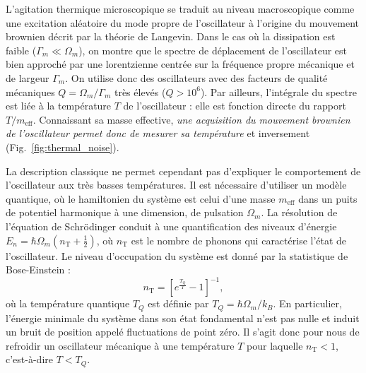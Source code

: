 \documentclass[12pt,a4paper]{article}
\begin{document}
L'agitation thermique microscopique se traduit au niveau macroscopique comme une excitation aléatoire du mode propre de l'oscillateur à l'origine du mouvement brownien décrit par la théorie de Langevin.
Dans le cas où la dissipation est faible ($\Gamma_m \ll \Omega_m$), on montre que le spectre de déplacement de l'oscillateur est bien approché par une lorentzienne centrée sur la fréquence propre mécanique et de largeur $\Gamma_m$.
On utilise donc des oscillateurs avec des facteurs de qualité mécaniques $Q=\Omega_m/\Gamma_m$ très élevés ($Q>10^6$).
Par ailleurs, l'intégrale du spectre est liée à la température $T$ de l'oscillateur : elle est fonction directe du rapport $T/m_\mathrm{eff}$.
Connaissant sa masse effective, \textit{une acquisition du mouvement brownien de l'oscillateur permet donc de mesurer sa température} et inversement (Fig.~\ref{fig:thermal_noise}).

La description classique ne permet cependant pas d'expliquer le comportement de l'oscillateur aux très basses températures.
Il est nécessaire d'utiliser un modèle quantique, où le hamiltonien du système est celui d'une masse $m_\mathrm{eff}$ dans un puits de potentiel harmonique à une dimension, de pulsation $\Omega_m$.
La résolution de l'équation de Schrödinger conduit à une quantification des niveaux d'énergie $E_n = \hbar\Omega_m (n_\mathrm{T}+\frac{1}{2})$, où $n_\mathrm{T}$ est le nombre de phonons qui caractérise l'état de l'oscillateur.
Le niveau d'occupation du système est donné par la statistique de Bose-Einstein :
\begin{equation}
n_\mathrm{T} = \left[ e^\frac{T_Q}{T} -1\right]^{-1},
\label{eq:phonon_number}
\end{equation}
où la température quantique $T_Q$ est définie par $T_Q = \hbar\Omega_m/k_B$.
En particulier, l'énergie minimale du système dans son état fondamental n'est pas nulle et induit un bruit de position appelé \og fluctuations de point zéro\fg{}.
Il s'agit donc pour nous de refroidir un oscillateur mécanique à une température $T$ pour laquelle $n_\mathrm{T}<1$, c'est-à-dire $T<T_Q$.
\end{document}
